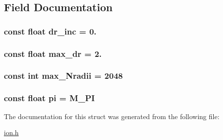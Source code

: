 \subsection{Field Documentation}
\hypertarget{struct_c_o_n_s_t_a_n_t_s_aee74bf2783f87d610cfb7a42933cb3a3}{
\subsubsection[{dr\+\_\+inc}]{\setlength{\rightskip}{0pt plus 5cm}const float dr\+\_\+inc = 0.}}\label{struct_c_o_n_s_t_a_n_t_s_aee74bf2783f87d610cfb7a42933cb3a3}
\hypertarget{struct_c_o_n_s_t_a_n_t_s_a5ddc9828f90dc883b9baf3dfab1cd3e6}{
\subsubsection[{max\+\_\+dr}]{\setlength{\rightskip}{0pt plus 5cm}const float max\+\_\+dr = 2.}}\label{struct_c_o_n_s_t_a_n_t_s_a5ddc9828f90dc883b9baf3dfab1cd3e6}
\hypertarget{struct_c_o_n_s_t_a_n_t_s_afe3adcf3ff974c278558c412f9ba9aaa}{
\subsubsection[{max\+\_\+\+Nradii}]{\setlength{\rightskip}{0pt plus 5cm}const int max\+\_\+\+Nradii = 2048}}\label{struct_c_o_n_s_t_a_n_t_s_afe3adcf3ff974c278558c412f9ba9aaa}
\hypertarget{struct_c_o_n_s_t_a_n_t_s_abce8f0db8a5282e441988c8d2e73f79e}{
\subsubsection[{pi}]{\setlength{\rightskip}{0pt plus 5cm}const float pi = M\+\_\+\+P\+I}}\label{struct_c_o_n_s_t_a_n_t_s_abce8f0db8a5282e441988c8d2e73f79e}


The documentation for this struct was generated from the following file\+:\begin{DoxyCompactItemize}
\item 
\hyperlink{ion_8h}{ion.\+h}\end{DoxyCompactItemize}
